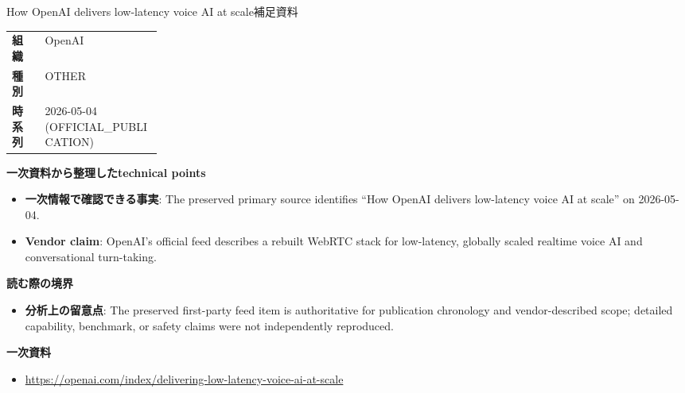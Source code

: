 \begin{technicalnote}{How OpenAI delivers low-latency voice AI at scale}{補足資料}
\begin{tabularx}{\linewidth}{@{}>{\bfseries}p{0.22\linewidth}X@{}}
組織 & OpenAI \\
種別 & OTHER \\
時系列 & 2026-05-04 (OFFICIAL\_PUBLICATION) \\
\end{tabularx}
\smallskip
{\bfseries 一次資料から整理したtechnical points}
\begin{itemize}[leftmargin=1.5em,itemsep=0.35em]
\item \textbf{一次情報で確認できる事実}: The preserved primary source identifies “How OpenAI delivers low-latency voice AI at scale” on 2026-05-04.
\item \textbf{Vendor claim}: OpenAI's official feed describes a rebuilt WebRTC stack for low-latency, globally scaled realtime voice AI and conversational turn-taking.
\end{itemize}
{\bfseries 読む際の境界}
\begin{itemize}[leftmargin=1.5em,itemsep=0.35em]
\item \textbf{分析上の留意点}: The preserved first-party feed item is authoritative for publication chronology and vendor-described scope; detailed capability, benchmark, or safety claims were not independently reproduced.
\end{itemize}
{\bfseries 一次資料}
\begingroup\sloppy
\begin{itemize}[leftmargin=1.5em,itemsep=0.25em]
\item {\scriptsize\url{https://openai.com/index/delivering-low-latency-voice-ai-at-scale}}
\end{itemize}
\endgroup
\end{technicalnote}
\medskip
